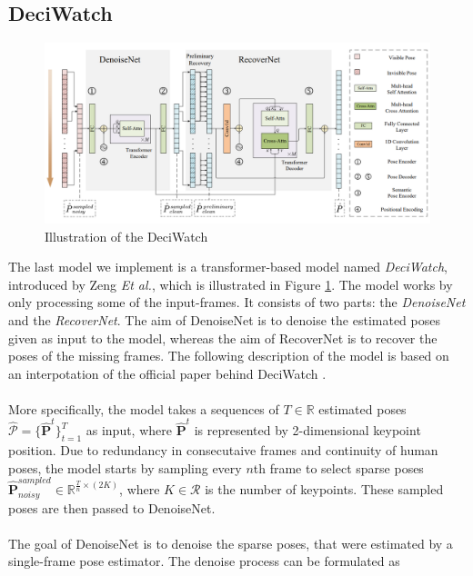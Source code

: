 \documentclass[./main.tex]{subfiles}
\begin{document}
\subsection{DeciWatch}
\begin{figure}[htbp]
    \centering
    \includegraphics[width=\textwidth]{./entities/deciwatch.PNG}
    \caption{Illustration of the DeciWatch \cite{https://doi.org/10.48550/arxiv.2203.08713}}
    \label{fig:deciwatch}
\end{figure}
\noindent The last model we implement is a transformer-based model named \textit{DeciWatch}, introduced by Zeng \textit{Et al.}, which is illustrated in Figure \ref{fig:deciwatch}. The model works by only processing some of the input-frames. It consists of two parts: the \textit{DenoiseNet} and the \textit{RecoverNet}. The aim of DenoiseNet is to denoise the estimated poses given as input to the model, whereas the aim of RecoverNet is to recover the poses of the missing frames. The following description of the model is based on an interpotation of the official paper behind DeciWatch \cite{https://doi.org/10.48550/arxiv.2203.08713}.
\\
\\
More specifically, the model takes a sequences of $T \in \mathbb{R}$ estimated poses $\hat{\mathcal{P}} = \{\hat{\bm{P}}^t\}_{t = 1} ^T$ as input, where $\hat{\bm{P}}^t$ is represented by 2-dimensional keypoint position. Due to redundancy in consecutaive frames and continuity of human poses, the model starts by sampling every $n$th frame to select sparse poses $\hat{\bm{P}}^{sampled} _{noisy} \in \mathbb{R}^{\frac{T}{n} \times (2K)}$, where $K \in \mathcal{R}$ is the number of keypoints. These sampled poses are then passed to DenoiseNet.
\\
\\
The goal of DenoiseNet is to denoise the sparse poses, that were estimated by a single-frame pose estimator. The denoise process can be formulated as
\end{document}
